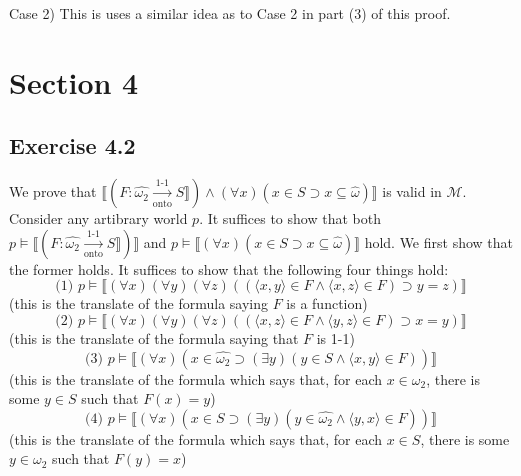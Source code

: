 \documentclass{article}
\newcommand{\lbc}{\llbracket}
\newcommand{\rbc}{\rrbracket}
\theoremstyle{definition}
\begin{document}
Case 2) This is uses a similar idea as to Case 2 in part (3) of this proof.

\section*{Section 4}

\subsection*{Exercise 4.2}
We prove that $\lbc (F:\widehat{\omega_2}\xrightarrow[\textrm{onto}]{\text{1-1}}S\rbc)\wedge(\forall x)(x\in S\supset x\subseteq\hat{\omega})\rbc$ 
is valid in $\mathcal{M}$. Consider any artibrary world $p$. It suffices to show that both 
$p\vDash\lbc (F:\widehat{\omega_2}\xrightarrow[\textrm{onto}]{\text{1-1}}S\rbc)\rbc$ and 
$p\vDash\lbc (\forall x)(x\in S\supset x\subseteq\hat{\omega})\rbc$ hold. We first show that the former holds. It suffices to show that 
the following four things hold:
\[\textrm{(1) }p\vDash\lbc(\forall x)(\forall y)(\forall z)((\langle x,y\rangle\in F\wedge\langle x,z\rangle\in F)\supset y=z)\rbc \]
(this is the translate of the formula saying $F$ is a function)
\[\textrm{(2) }p\vDash\lbc(\forall x)(\forall y)(\forall z)((\langle x,z\rangle\in F\wedge\langle y,z\rangle\in F)\supset x=y)\rbc \]
(this is the translate of the formula saying that $F$ is 1-1)
\[\textrm{(3) }p\vDash\lbc(\forall x)(x\in\widehat{\omega_2}\supset(\exists y)(y\in S\wedge\langle x,y\rangle\in F))\rbc \]
(this is the translate of the formula which says that, for each $x\in\omega_2$, there is some $y\in S$ such that
$F(x)=y$)
\[\textrm{(4) }p\vDash\lbc(\forall x)(x\in S\supset(\exists y)(y\in\widehat{\omega_2}\wedge\langle y,x\rangle\in F))\rbc \]
(this is the translate of the formula which says that, for each $x\in S$, there is some $y\in\omega_2$ such that
$F(y)=x$)
\end{document}
